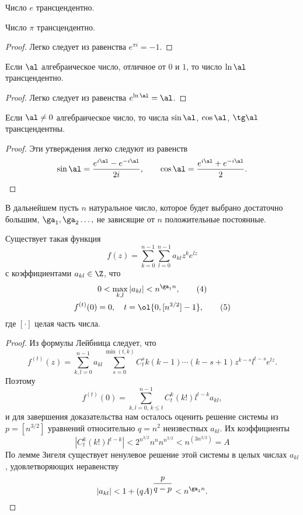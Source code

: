 \documentclass{article}
\begin{document}
\begin{imp}
Число $e$ трансцендентно.
\end{imp}

\begin{imp}
Число $\pi$ трансцендентно.
\end{imp}
\begin{proof}
Легко следует из равенства $e^{\pi i}=-1$.
\end{proof}

\begin{imp}
Если $\al$ алгебраическое число, отличное от $0$    и
$1$, то число $\ln {\al}$ трансцендентно.
\end{imp}
\begin{proof}
Легко следует из равенства $e^{\ln \al}= \al$.
\end{proof}

\begin{imp}
Если $\al \ne 0$ алгебраическое число, то числа
$\sin \al$, $\cos \al$, $\tg \al$ трансцендентны.
\end{imp}
\begin{proof}
Эти утверждения легко следуют из равенств
$$
\sin \al = \frac {e^{i \al}- e^{-i \al}}{2i}, \qquad
\cos \al = \frac {e^{i \al}+ e^{-i \al}}{2}.
$$
\hfill\end{proof}

В дальнейшем пусть $n$ натуральное число, которое будет выбрано достаточно
большим, $\ga_1, \ga_2 \dots, $
не зависящие от $n$ положительные постоянные.

\begin{lemma}
Существует такая функция
\begin{equation}[3]
f(z)=\sum_{k=0}^{n-1} \sum_{l=0}^{n-1} a_{kl}z^k e^{lz}
\end{equation}
с коэффициентами $a_{kl} \in \Z$, что
\begin{gather}
0 < \max_{k,l} |a_{kl}| < n^{\ga_1n},
\tag 4 \\
f^{(t)}(0)=0, \quad t= \ol {0,[n^{3/2}]-1},
\tag 5
\end{gather}
где $[\cdot]$  целая часть числа.
\end{lemma}
\begin{proof}
Из формулы Лейбница следует, что
\begin{equation}[6]
f^{(t)}(z)= \sum_{k,l=0}^{n-1}a_{kl} \sum_{s=0}^{\min (t,k)}C_t^s
k(k-1) \cdots (k-s+1) z^{k-s} l^{t-s} e^{lz}.
\end{equation}
Поэтому
$$
f^{(t)}(0)=\sum_{k,l=0,\, k\le t}^{n-1}C_t^k(k!)l^{t-k}a_{kl},
$$
и для завершения доказательства нам осталось оценить
решение системы из $p=[n^{3/2}]$ уравнений  относительно
$q=n^2$   неизвестных  $a_{kl}$. Их коэффициенты
$$
|C_t^k(k!)l^{t-k}|<2^{n^{3/2}}n^nn^{n^{3/2}}<n^{(3n^{3/2})}=A
$$
По лемме Зигеля существует ненулевое решение этой системы в целых числах
$a_{kl}$, удовлетворяющих неравенству
$$
|a_{kl}|<1+(qA)^{\dfrac p{q-p}}<n^{\ga_1n}.
$$
\hfill\end{proof}
\end{document}
